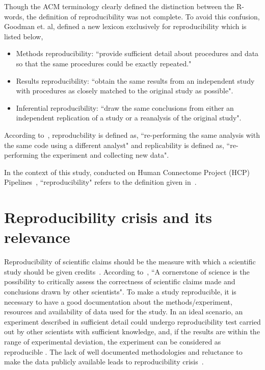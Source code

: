 Though the ACM terminology clearly defined the distinction between the R-words, the definition of reproducibility was not complete. To avoid this confusion, Goodman et. al, defined a new lexicon exclusively for reproducibility \cite{Goodman2016} which is listed below,

\begin{itemize}
\item {Methods reproducibility: ``provide sufficient detail about procedures and data so that the same procedures could be exactly repeated."}
\item {Results reproducibility: ``obtain the same results from an independent study with procedures as closely matched to the original study as possible".}
\item {Inferential reproducibility: ``draw the same conclusions from either an independent replication of a study or a reanalysis of the original study".}
\end{itemize}

According to~\cite{Patil2016}, reproducbility is defined as, ``re-performing the same analysis with the same code using a different analyst" and replicability is defined as, ``re-performing the experiment and collecting new data".

In the context of this study, conducted on Human Connectome Project (HCP) Pipelines~\cite{Gla13}, ``reproducibility" refers to the definition given in~\cite{Patil2016}. 

\section{Reproducibility crisis and its relevance}
Reproducibility of scientific claims should be the measure with which a scientific study should be given credits~\cite{aac4716}. According to~\cite{Plesser2018}, ``A cornerstone of science is the possibility to critically assess the correctness of scientific claims made and conclusions drawn by other scientists".
To make a study reproducible, it is necessary to have a good documentation about the methods/experiment, resources and availability of data used for the study. In an ideal scenario, an experiment described in sufficient detail could undergo reproducibility test carried out by other scientists with sufficient knowledge, and, if the results are within the range of experimental deviation, the experiment can be considered as reproducible \cite{Plesser2018}. The lack of well documented methodologies and reluctance to make the data publicly available leads to reproducibility crisis~\cite{Baker2016}.

